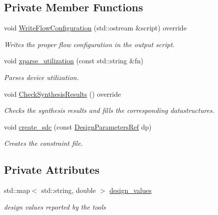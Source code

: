 \subsection*{Private Member Functions}
\begin{DoxyCompactItemize}
\item 
void \hyperlink{classAlteraBackendFlow_a4138bec7596448fb21b796dd31e65d6f}{Write\+Flow\+Configuration} (std\+::ostream \&script) override
\begin{DoxyCompactList}\small\item\em Writes the proper flow configuration in the output script. \end{DoxyCompactList}\item 
void \hyperlink{classAlteraBackendFlow_ac566361f8b25433c52b90ec30b100d35}{xparse\+\_\+utilization} (const std\+::string \&fn)
\begin{DoxyCompactList}\small\item\em Parses device utilization. \end{DoxyCompactList}\item 
void \hyperlink{classAlteraBackendFlow_a36da7a0f6807798fbbb334b6cb5d4677}{Check\+Synthesis\+Results} () override
\begin{DoxyCompactList}\small\item\em Checks the synthesis results and fills the corresponding datastructures. \end{DoxyCompactList}\item 
void \hyperlink{classAlteraBackendFlow_a176b73daf2c6c80d929647205b95571d}{create\+\_\+sdc} (const \hyperlink{DesignParameters_8hpp_ae36bb1c4c9150d0eeecfe1f96f42d157}{Design\+Parameters\+Ref} dp)
\begin{DoxyCompactList}\small\item\em Creates the constraint file. \end{DoxyCompactList}\end{DoxyCompactItemize}
\subsection*{Private Attributes}
\begin{DoxyCompactItemize}
\item 
std\+::map$<$ std\+::string, double $>$ \hyperlink{classAlteraBackendFlow_a9ac59d97dbc735fef9f6ccb673ca179f}{design\+\_\+values}
\begin{DoxyCompactList}\small\item\em design values reported by the tools \end{DoxyCompactList}\end{DoxyCompactItemize}
